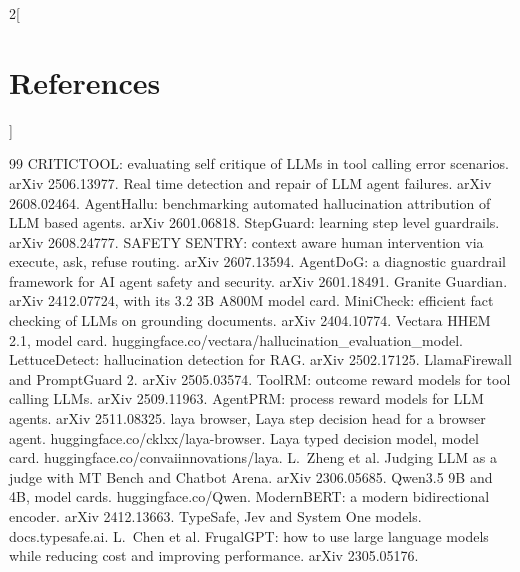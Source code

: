\documentclass[10pt,a4paper]{article}
\begin{document}
\setlength{\multicolsep}{0pt}
\begin{multicols}{2}[\section*{References}\vspace{-2pt}]
\footnotesize\raggedright\renewcommand{\section}[2]{}%
\begin{thebibliography}{99}
\setlength{\itemsep}{0pt}\setlength{\parsep}{0pt}
 CRITICTOOL: evaluating self critique of LLMs in tool calling error scenarios. arXiv 2506.13977.
 Real time detection and repair of LLM agent failures. arXiv 2608.02464.
 AgentHallu: benchmarking automated hallucination attribution of LLM based agents. arXiv 2601.06818.
 StepGuard: learning step level guardrails. arXiv 2608.24777.
 SAFETY SENTRY: context aware human intervention via execute, ask, refuse routing. arXiv 2607.13594.
 AgentDoG: a diagnostic guardrail framework for AI agent safety and security. arXiv 2601.18491.
 Granite Guardian. arXiv 2412.07724, with its 3.2 3B A800M model card.
 MiniCheck: efficient fact checking of LLMs on grounding documents. arXiv 2404.10774.
 Vectara HHEM 2.1, model card. huggingface.co/vectara/hallucination\_evaluation\_model.
 LettuceDetect: hallucination detection for RAG. arXiv 2502.17125.
 LlamaFirewall and PromptGuard 2. arXiv 2505.03574.
 ToolRM: outcome reward models for tool calling LLMs. arXiv 2509.11963.
 AgentPRM: process reward models for LLM agents. arXiv 2511.08325.
 laya browser, Laya step decision head for a browser agent. huggingface.co/cklxx/laya-browser.
 Laya typed decision model, model card. huggingface.co/convaiinnovations/laya.
 L.\ Zheng et al. Judging LLM as a judge with MT Bench and Chatbot Arena. arXiv 2306.05685.
 Qwen3.5 9B and 4B, model cards. huggingface.co/Qwen.
 ModernBERT: a modern bidirectional encoder. arXiv 2412.13663.
 TypeSafe, Jev and System One models. docs.typesafe.ai.
 L.\ Chen et al. FrugalGPT: how to use large language models while reducing cost and improving performance. arXiv 2305.05176.

\end{thebibliography}
\end{multicols}
\end{document}
